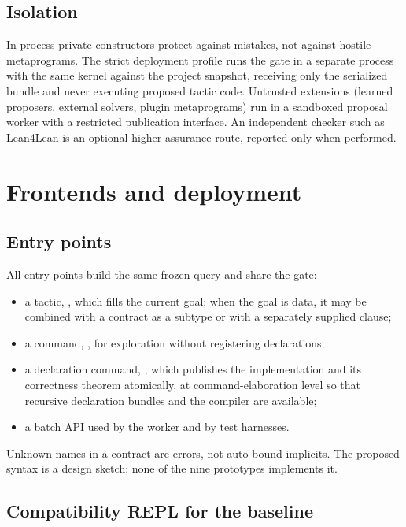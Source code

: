 \subsection{Isolation}

In-process private constructors protect against mistakes, not against hostile metaprograms. The strict deployment profile runs the gate in a separate process with the same kernel against the project snapshot, receiving only the serialized bundle and never executing proposed tactic code. Untrusted extensions (learned proposers, external solvers, plugin metaprograms) run in a sandboxed proposal worker with a restricted publication interface. An independent checker such as Lean4Lean \cite{lean4lean} is an optional higher-assurance route, reported only when performed.

\section{Frontends and deployment}\label{sec:deployment}

\subsection{Entry points}

All entry points build the same frozen query and share the gate:
\begin{itemize}
\item a tactic, , which fills the current goal; when the goal is data, it may be combined with a contract as a subtype or with a separately supplied  clause;
\item a command, , for exploration without registering declarations;
\item a declaration command, , which publishes the implementation and its correctness theorem atomically, at command-elaboration level so that recursive declaration bundles and the compiler are available;
\item a batch API used by the worker and by test harnesses.
\end{itemize}
Unknown names in a contract are errors, not auto-bound implicits. The proposed syntax is a design sketch; none of the nine prototypes implements it.

\subsection{Compatibility REPL for the baseline}\label{sec:repl}


